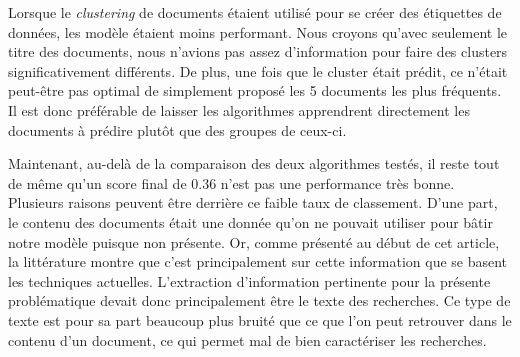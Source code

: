 Lorsque le \textit{clustering} de documents étaient utilisé pour se créer des étiquettes de données, les modèle étaient moins performant. Nous croyons qu'avec seulement le titre des documents, nous n'avions pas assez d'information pour faire des clusters significativement différents. De plus, une fois que le cluster était prédit, ce n'était peut-être pas optimal de simplement proposé les 5 documents les plus fréquents. Il est donc préférable de laisser les algorithmes apprendrent directement les documents à prédire plutôt que des groupes de ceux-ci.
\break

Maintenant, au-delà de la comparaison des deux algorithmes testés, il reste tout de même qu'un score final de 0.36 n'est pas une performance très bonne. Plusieurs raisons peuvent être derrière ce faible taux de classement. D'une part, le contenu des documents était une donnée qu'on ne pouvait utiliser pour bâtir notre modèle puisque non présente. Or, comme présenté au début de cet article, la littérature montre que c'est principalement sur cette information que se basent les techniques actuelles. L'extraction d'information pertinente pour la présente problématique devait donc principalement être le texte des recherches. Ce type de texte est pour sa part beaucoup plus bruité que ce que l'on peut retrouver dans le contenu d'un document, ce qui permet mal de bien caractériser les recherches.

	